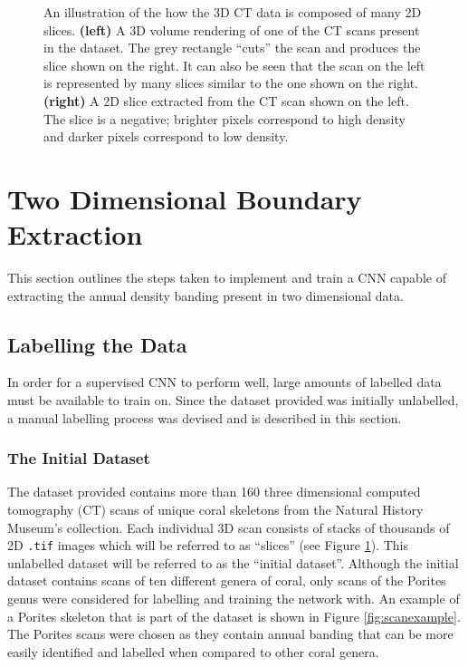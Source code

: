 \begin{figure}[!t]
\begin{subfigure}[t]{0.49\textwidth}
    \end{subfigure}
    \caption{An illustration of the how the 3D CT data is composed of many 2D slices. \textbf{(left)} A 3D volume rendering of one of the CT scans present in the dataset. The grey rectangle ``cuts'' the scan and produces the slice shown on the right. It can also be seen that the scan on the left is represented by many slices similar to the one shown on the right. \textbf{(right)} A 2D slice extracted from the CT scan shown on the left. The slice is a negative; brighter pixels correspond to high density and darker pixels correspond to low density.}
    \label{fig:extraction}
\end{figure}

\section{Two Dimensional Boundary Extraction}

This section outlines the steps taken to implement and train a CNN capable of extracting the annual density banding present in two dimensional data.

\subsection{Labelling the Data}
\label{sec:2dlabel}

In order for a supervised CNN to perform well, large amounts of labelled data must be available to train on. Since the dataset provided was initially unlabelled, a manual labelling process was devised and is described in this section.

\subsubsection{The Initial Dataset}

The dataset provided contains more than 160 three dimensional computed tomography (CT) scans of unique coral skeletons from the Natural History Museum's collection. Each individual 3D scan consists of stacks of thousands of 2D \texttt{.tif} images which will be referred to as ``slices'' (see Figure \ref{fig:extraction}). This unlabelled dataset will be referred to as the ``initial dataset''. Although the initial dataset contains scans of ten different genera of coral, only scans of the Porites genus were considered for labelling and training the network with. An example of a Porites skeleton that is part of the dataset is shown in Figure \ref{fig:scanexample}. The Porites scans were chosen as they contain annual banding that can be more easily identified and labelled when compared to other coral genera.

